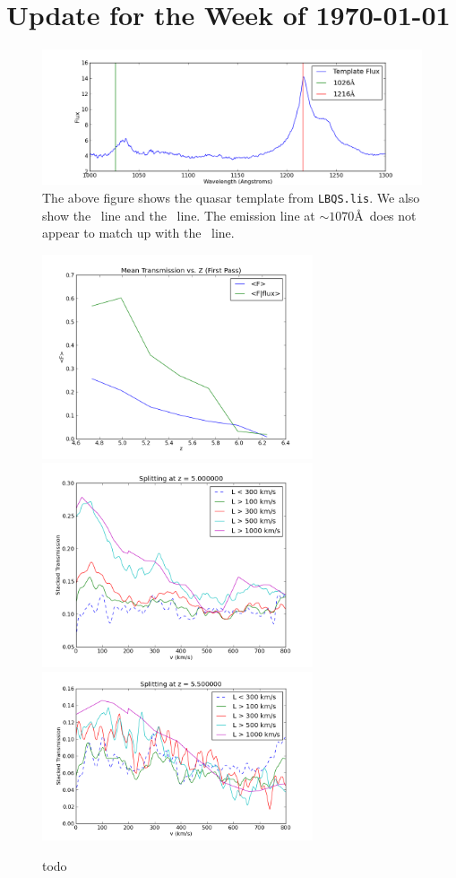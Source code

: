 \documentclass[11pt]{article}
\begin{document}
\section*{Update for the Week of \today}

\begin{figure}[h]
  \centering
  \includegraphics[width=15cm]{QSOTemplateCheck.png}
  \caption{The above figure shows the quasar template from {\tt LBQS.lis}. We also show the \lya\ line and the \lyb\ line. The emission line at $\sim 1070$\AA\ does not appear to match up with the \lyb\ line.}
  \label{fig:todo}
\end{figure}

\begin{figure}[h]
  \centering
  \includegraphics[width=8cm]{meanFs.png}
  \includegraphics[width=8cm]{Stack_Zgreaterthan5.png}
  \includegraphics[width=8cm]{Stack_Zgreaterthan5p5.png}
  \caption{todo}
  \label{fig:todo}
\end{figure}
\end{document}
